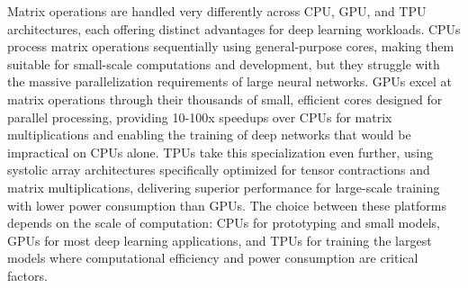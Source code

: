 \begin{remark}
Matrix operations are handled very differently across CPU, GPU, and TPU architectures, each offering distinct advantages for deep learning workloads. CPUs process matrix operations sequentially using general-purpose cores, making them suitable for small-scale computations and development, but they struggle with the massive parallelization requirements of large neural networks. GPUs excel at matrix operations through their thousands of small, efficient cores designed for parallel processing, providing 10-100x speedups over CPUs for matrix multiplications and enabling the training of deep networks that would be impractical on CPUs alone. TPUs take this specialization even further, using systolic array architectures specifically optimized for tensor contractions and matrix multiplications, delivering superior performance for large-scale training with lower power consumption than GPUs. The choice between these platforms depends on the scale of computation: CPUs for prototyping and small models, GPUs for most deep learning applications, and TPUs for training the largest models where computational efficiency and power consumption are critical factors.
\end{remark}
